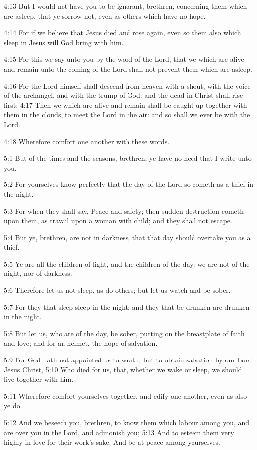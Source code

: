 4:13 But I would not have you to be ignorant, brethren, concerning
them which are asleep, that ye sorrow not, even as others which have
no hope.

4:14 For if we believe that Jesus died and rose again, even so them
also which sleep in Jesus will God bring with him.

4:15 For this we say unto you by the word of the Lord, that we which
are alive and remain unto the coming of the Lord shall not prevent
them which are asleep.

4:16 For the Lord himself shall descend from heaven with a shout, with
the voice of the archangel, and with the trump of God: and the dead in
Christ shall rise first: 4:17 Then we which are alive and remain shall
be caught up together with them in the clouds, to meet the Lord in the
air: and so shall we ever be with the Lord.

4:18 Wherefore comfort one another with these words.

5:1 But of the times and the seasons, brethren, ye have no need that I
write unto you.

5:2 For yourselves know perfectly that the day of the Lord so cometh
as a thief in the night.

5:3 For when they shall say, Peace and safety; then sudden destruction
cometh upon them, as travail upon a woman with child; and they shall
not escape.

5:4 But ye, brethren, are not in darkness, that that day should
overtake you as a thief.

5:5 Ye are all the children of light, and the children of the day: we
are not of the night, nor of darkness.

5:6 Therefore let us not sleep, as do others; but let us watch and be
sober.

5:7 For they that sleep sleep in the night; and they that be drunken
are drunken in the night.

5:8 But let us, who are of the day, be sober, putting on the
breastplate of faith and love; and for an helmet, the hope of
salvation.

5:9 For God hath not appointed us to wrath, but to obtain salvation by
our Lord Jesus Christ, 5:10 Who died for us, that, whether we wake or
sleep, we should live together with him.

5:11 Wherefore comfort yourselves together, and edify one another,
even as also ye do.

5:12 And we beseech you, brethren, to know them which labour among
you, and are over you in the Lord, and admonish you; 5:13 And to
esteem them very highly in love for their work's sake. And be at peace
among yourselves.

